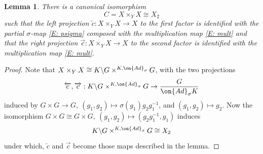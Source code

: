 \documentclass[11pt]{amsart}
\newtheorem{lem}[thm]{Lemma}
\theoremstyle{definition}
\theoremstyle{definition}
\theoremstyle{definition}
\numberwithin{equation}{subsection}
\newcommand{\Ad}{{\on{Ad}}}
\begin{document}
\begin{lem}
\label{L: decom of C}
There is a canonical isomorphism
\[C=X\times_YX\cong X_2\]
such that the left projection $\overleftarrow{c}:X\times_YX\to X$ to the first factor is identified with the partial $\sigma$-map \eqref{E: psigma} composed with the multiplication map \eqref{E: mult} and
that  the right projection $\overrightarrow{c}:X\times_YX\to X$ to the second factor is identified with the multiplication map \eqref{E: mult}.
\end{lem}
\begin{proof}
Note that $X\times_YX\cong K\backslash G\times^{K, \Ad_\sigma}G$, with the two projections 
$$\overleftarrow{c},\overrightarrow{c}:  K\backslash G\times^{K, \Ad_\sigma}G\to \frac{G}{\Ad_\sigma K}$$ 
induced by $G\times G\to G, \ (g_1,g_2)\mapsto \sigma(g_1)g_2g_1^{-1}$, and $(g_1,g_2)\mapsto g_2$.
Now the isomorphism $G\times G\cong G\times G,\ (g_1,g_2)\mapsto (g_2g_1^{-1}, g_1)$ induces
\[
 K\backslash G\times^{K, \Ad_\sigma}G \cong  X_2\]
under which, $\overleftarrow{c}$ and $\overrightarrow{c}$ become those maps described in the lemma.
\end{proof}
\end{document}
